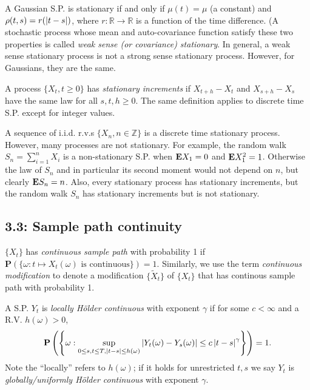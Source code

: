 \begin{proposition*}
A Gaussian S.P. is stationary if and only if $\mu(t) = \mu$ (a constant) and $\rho(t,s) = r(\left\lvert t-s \right\rvert)$, where $r:\mathbb R \to \mathbb R$ is a function of the time difference. (A stochastic process whose mean and auto-covariance function satisfy these two properties is called \emph{weak sense (or covariance) stationary}. In general, a weak sense stationary process is not a strong sense stationary process. However, for Gaussians, they are the same.
\end{proposition*}


\begin{definition*}
A process $\{X_t, t\geq0\}$ has \emph{stationary increments} if $X_{t+h}-X_t$ and $X_{s+h}-X_s$ have the same law for all $s,t,h\geq0$. The same definition applies to discrete time S.P. except for integer values.
\end{definition*}

\begin{example*}
A sequence of i.i.d. r.v.s $\{X_n,n\in\mathbb Z\}$ is a discrete time stationary process. However, many processes are not stationary. For example, the random walk $S_n = \sum_{i=1}^n X_i$ is a non-stationary S.P. when $\mathbf{E} X_1 = 0$ and $\mathbf{E} X_1^2 = 1$. Otherwise the law of $S_n$ and in particular its second moment would not depend on $n$, but clearly $\mathbf{E} S_n = n$. Also, every stationary process has stationary increments, but the random walk $S_n$ has stationary increments but is not stationary.
\end{example*}

\subsection*{3.3: Sample path continuity}
\begin{definition*}
$\{X_t\}$ has \emph{continuous sample path} with probability 1 if $\mathbf P(\{\omega : t\mapsto X_t(\omega) \text{ is continuous}\})=1$. Similarly, we use the term \emph{continuous modification} to denote a modification $\{\tilde X_t\}$ of $\{X_t\}$ that has continous sample path with probability 1.
\end{definition*}

\begin{definition*}
A S.P. $Y_t$ is \emph{locally H\"older continuous} with exponent $\gamma$ if for some $c < \infty$ and a R.V. $h(\omega)>0$, 
\[
	\mathbf P\left( \left\{ \omega : \sup_{0\leq s,t\leq T, \left\lvert t-s \right\rvert \leq h(\omega)} \left\lvert Y_t(\omega) - Y_s(\omega) \right\rvert \leq c \left\lvert t-s \right\rvert^\gamma \right\}\right) = 1.
\]
Note the ``locally'' refers to $h(\omega)$; if it holds for unrestricted $t,s$ we say $Y_t$ is \emph{globally/uniformly H\"older continuous} with exponent $\gamma$.
\end{definition*}

